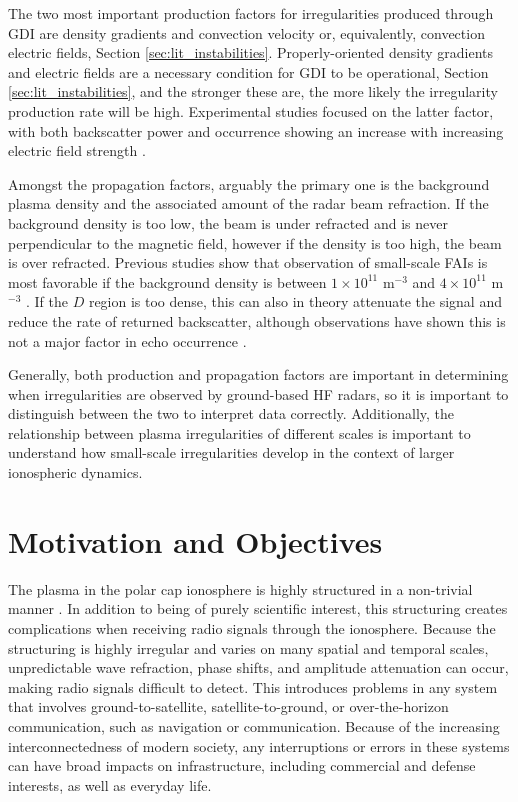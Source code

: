 The two most important production factors for irregularities produced through GDI are density gradients and convection velocity or, equivalently, convection electric fields, Section \ref{sec:lit_instabilities}.  Properly-oriented density gradients and electric fields are a necessary condition for GDI to be operational, Section \ref{sec:lit_instabilities}, and the stronger these are, the more likely the irregularity production rate will be high.  Experimental studies focused on the latter factor, with both backscatter power and occurrence showing an increase with increasing electric field strength \citep{Fukumoto2000,Danskin2002,Makarevich2014b}.

Amongst the propagation factors, arguably the primary one is the background plasma density and the associated amount of the radar beam refraction.  If the background density is too low, the beam is under refracted and is never perpendicular to the magnetic field, however if the density is too high, the beam is over refracted. Previous studies show that observation of small-scale FAIs is most favorable if the background density is between \(1\times 10^{11}\) m\(^{-3}\) and \(4\times 10^{11}\) m\(^{-3}\) \citep{Danskin2002,Makarevich2014b}.  If the \(D\) region is too dense, this can also in theory attenuate the signal and reduce the rate of returned backscatter, although observations have shown this is not a major factor in echo occurrence \citep{Danskin2002}.  

Generally, both production and propagation factors are important in determining when irregularities are observed by ground-based HF radars, so it is important to distinguish between the two to interpret data correctly.  Additionally, the relationship between plasma irregularities of different scales is important to understand how small-scale irregularities develop in the context of larger ionospheric dynamics.


\section{Motivation and Objectives}

The plasma in the polar cap ionosphere is highly structured in a non-trivial manner \citep{Tsunoda1988,Carlson2012}.  In addition to being of purely scientific interest, this structuring creates complications when receiving radio signals through the ionosphere.  Because the structuring is highly irregular and varies on many spatial and temporal scales, unpredictable wave refraction, phase shifts, and amplitude attenuation can occur, making radio signals difficult to detect.  This introduces problems in any system that involves ground-to-satellite, satellite-to-ground, or over-the-horizon communication, such as navigation or communication.  Because of the increasing interconnectedness of modern society, any interruptions or errors in these systems can have broad impacts on infrastructure, including commercial and defense interests, as well as everyday life.

